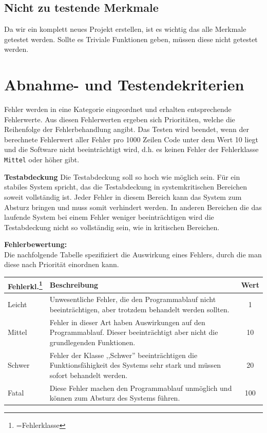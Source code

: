 \documentclass[fontsize=12pt,paper=a4,twoside]{scrartcl}
\begin{document}
\subsection{Nicht zu testende Merkmale}\label{c05}
Da wir ein komplett neues Projekt erstellen, ist es wichtig das alle Merkmale getestet werden. Sollte es Triviale Funktionen geben, müssen diese nicht getestet werden.

\section{Abnahme- und Testendekriterien}\label{c07}

Fehler werden in eine Kategorie eingeordnet und erhalten entsprechende Fehlerwerte. Aus diesen Fehlerwerten ergeben sich Prioritäten, welche die Reihenfolge der Fehlerbehandlung angibt. Das Testen wird beendet, wenn der berechnete Fehlerwert aller Fehler pro 1000 Zeilen Code unter dem Wert 10 liegt und die Software nicht beeinträchtigt wird, d.h. es keinen Fehler der Fehlerklasse \texttt{Mittel} oder höher gibt.

\textbf{Testabdeckung}
Die Testabdeckung soll so hoch wie möglich sein. Für ein stabiles System spricht, das die Testabdeckung in systemkritischen Bereichen soweit vollständig ist. Jeder Fehler in diesem Bereich kann das System zum Absturz bringen und muss somit verhindert werden. In anderen Bereichen die das laufende System bei einem Fehler weniger beeinträchtigen wird die Testabdeckung nicht so vollständig sein, wie in kritischen Bereichen.

\textbf{Fehlerbewertung:}\\
Die nachfolgende Tabelle spezifiziert die Auswirkung eines Fehlers, durch die man diese nach Priorität einordnen kann.\\

\begin{tabularx}{\textwidth}{|p{2cm}|p{11.53cm}|c|}
\hline
	\textbf{Fehlerkl.\footnote{=Fehlerklasse}} & \textbf{Beschreibung} & \textbf{Wert}\\
\hline
	Leicht & Unwesentliche Fehler, die den Programmablauf nicht beeinträchtigen, aber trotzdem behandelt werden sollten. & 1\\
\hline
	Mittel & Fehler in dieser Art haben Auswirkungen auf den Programmablauf. Dieser beeinträchtigt aber nicht die grundlegenden Funktionen. & 10\\
\hline
	Schwer & Fehler der Klasse ,,Schwer'' beeinträchtigen die Funktionsfähigkeit des Systems sehr stark und müssen sofort behandelt werden. & 20\\
\hline
	Fatal & Diese Fehler machen den Programmablauf unmöglich und können zum Absturz des Systems führen.  & 100\\
\hline
\end{tabularx}
\end{document}
